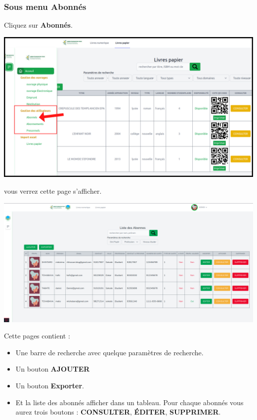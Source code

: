 \documentclass[12pt,a4paper]{article}
\begin{document}
\newpage
\subsubsection{Sous menu \textbf{Abonnés}}
Cliquez sur \textbf{Abonnés}.
\begin{center}
\includegraphics[scale=0.5]{img/abonne_menu.png}
\end{center}
vous verrez cette page s'afficher.\\
\begin{center}
\includegraphics[scale=0.3]{img/abonnes_liste.png}
\end{center}
Cette pages contient :
\begin{itemize}
\item Une barre de recherche avec quelque paramètres de recherche.
\item Un bouton \textbf{AJOUTER}
\item Un bouton \textbf{Exporter}.
\item Et la liste des abonnés afficher dans un tableau. Pour chaque abonnés vous aurez trois boutons : 
\textbf{CONSULTER}, \textbf{ÉDITER}, \textbf{SUPPRIMER}.\\
\end{itemize}
\end{document}
